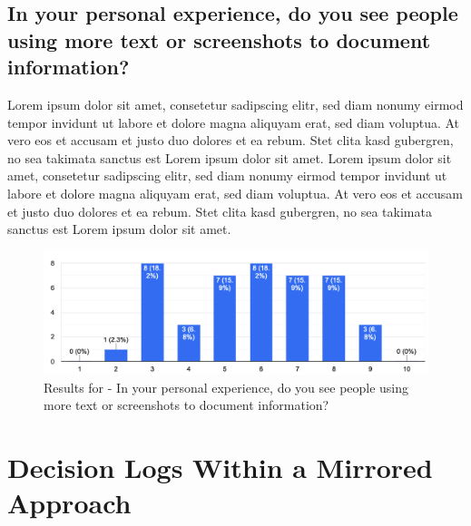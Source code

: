\subsection{In your personal experience, do you see people using more text or screenshots to document information?}
Lorem ipsum dolor sit amet, consetetur sadipscing elitr, sed diam nonumy eirmod tempor invidunt ut labore et dolore magna aliquyam erat, sed diam voluptua. At vero eos et accusam et justo duo dolores et ea rebum. Stet clita kasd gubergren, no sea takimata sanctus est Lorem ipsum dolor sit amet. Lorem ipsum dolor sit amet, consetetur sadipscing elitr, sed diam nonumy eirmod tempor invidunt ut labore et dolore magna aliquyam erat, sed diam voluptua. At vero eos et accusam et justo duo dolores et ea rebum. Stet clita kasd gubergren, no sea takimata sanctus est Lorem ipsum dolor sit amet.
\begin{figure}[h!]
\centering
\includegraphics[width=\linewidth]{Images/Survey/documents_5.png}
\caption{Results for - In your personal experience, do you see people using more text or screenshots to document information?}
\label{fig:results:highlighting:5}
\end{figure}

\section{Decision Logs Within a Mirrored Approach}

